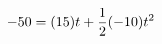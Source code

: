\documentclass[preview]{standalone}
\begin{document}
\begin{align*}
\special{dvisvgm:raw <g id='unique000'>}-50 = (15)t + \frac{1}{2} (-10) t^2\special{dvisvgm:raw </g>}
\end{align*}
\end{document}
